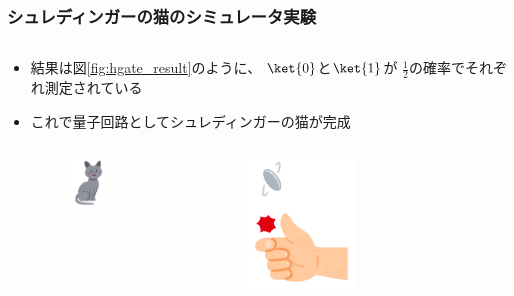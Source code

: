 \begin{frame}
  \frametitle{シュレディンガーの猫のシミュレータ実験}

  \begin{columns}
    \begin{column}{0.5\textwidth}
      \begin{itemize}
        \item<+-> 結果は図\ref{fig:hgate_result}のように、
        $\ket{0}$と$\ket{1}$が
        $\frac{1}{2}$の確率でそれぞれ測定されている

        \item<+-> これで量子回路としてシュレディンガーの猫が完成
        \begin{columns}
          \begin{column}{0.4\textwidth}
            \begin{figure}
              \includegraphics[width=0.5\textwidth]{./img/cat_russian_blue.png}
            \end{figure}
          \end{column}
          \begin{column}{0.4\textwidth}
            \begin{figure}
              \includegraphics[width=0.5\textwidth]{./img/coin_toss.png}

\end{figure}
\end{column}
\end{columns}
\end{itemize}
\end{column}
\end{columns}
\end{frame}
